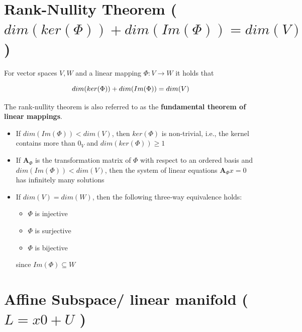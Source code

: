 

\section{Rank-Nullity Theorem ( $dim(ker(\Phi)) + dim(Im(\Phi)) = dim(V)$ ) \cite{mfml-1}}\label{Rank-Nullity Theorem}

For vector spaces $V, W$ and a linear mapping $\Phi : V \to W$ it holds that 

\[
    \hfill
    dim(ker(\Phi)) + dim(Im(\Phi)) = dim(V)
    \hfill
\]

The rank-nullity theorem is also referred to as the \textbf{fundamental theorem of linear mappings}.

\begin{itemize}
    \item If $dim(Im(\Phi)) < dim(V)$, then $ker(\Phi)$ is non-trivial, i.e., the kernel contains more than $0_V$ and $dim(ker(\Phi)) \geq 1$

    \item If $\mathbf{A}_\Phi$ is the transformation matrix of $\Phi$ with respect to an ordered basis and $dim(Im(\Phi)) < dim(V)$, then the system of linear equations $\mathbf{A}_\Phi x = 0$ has infinitely many solutions

    \item If $dim(V) = dim(W)$, then the following three-way equivalence holds: 
    \begin{itemize}
        \item $\Phi$ is injective

        \item $\Phi$ is surjective

        \item $\Phi$ is bijective 
    \end{itemize}
    since $Im(\Phi) \subseteq W$

    
\end{itemize}






\section{Affine Subspace/ linear manifold ( $L = x0 + U$ ) \cite{mfml-1}}\label{Affine Subspace/ linear manifold}

